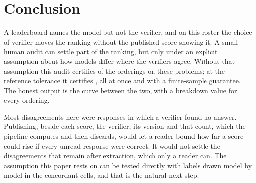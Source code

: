 \section{Conclusion}
\label{sec:conclusion}

A leaderboard names the model but not the verifier, and on this roster the choice of verifier
moves the ranking without the published score showing it. A small human audit can settle part of
the ranking, but only under an explicit assumption about how models differ where the verifiers
agree. Without that assumption this audit certifies \CertFixedNoPooling{} of the \NumOrderings{}
orderings on these problems; at the reference tolerance it certifies \CertFixedPrereg{}, all at once
and with a finite-sample guarantee. The honest output is the curve between the two, with a breakdown
value for every ordering.

Most disagreements here were responses in which a verifier found no answer. Publishing, beside
each score, the verifier, its version and that count, which the pipeline computes and then
discards, would let a reader bound how far a score could rise if every unread response were correct.
It would not settle the disagreements that remain after extraction, which only a reader can. The
assumption this paper rests on can be tested directly with labels drawn model by model in the
concordant cells, and that is the natural next step.
